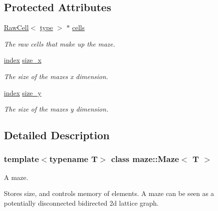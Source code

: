 \subsection*{Protected Attributes}
\begin{DoxyCompactItemize}
\item 
\hyperlink{classmaze_1_1RawCell}{Raw\+Cell}$<$ \hyperlink{classmaze_1_1Maze_a9f056be7a10507d578e4608e31a3d6fc}{type} $>$ $\ast$ \hyperlink{classmaze_1_1Maze_acafe6a6b48339133143ec0ddd7119bcf}{cells}
\begin{DoxyCompactList}\small\item\em The raw cells that make up the maze. \end{DoxyCompactList}\item 
\mbox{\label{classmaze_1_1Maze_a4b7e051645e4dfd8d06ba7f4a0c0a6f4}} 
\hyperlink{namespacemaze_ae8120a098fabafbbfa264a3c619640b3}{index} \hyperlink{classmaze_1_1Maze_a4b7e051645e4dfd8d06ba7f4a0c0a6f4}{size\+\_\+x}
\begin{DoxyCompactList}\small\item\em The size of the mazes x dimension. \end{DoxyCompactList}\item 
\mbox{\label{classmaze_1_1Maze_af00b31bf815cb59847190984da46bd87}} 
\hyperlink{namespacemaze_ae8120a098fabafbbfa264a3c619640b3}{index} \hyperlink{classmaze_1_1Maze_af00b31bf815cb59847190984da46bd87}{size\+\_\+y}
\begin{DoxyCompactList}\small\item\em The size of the mazes y dimension. \end{DoxyCompactList}\end{DoxyCompactItemize}


\subsection{Detailed Description}
\subsubsection*{template$<$typename T$>$\newline
class maze\+::\+Maze$<$ T $>$}

A maze. 

Stores size, and controls memory of elements. A maze can be seen as a potentially disconnected bidirected 2d lattice graph. 

